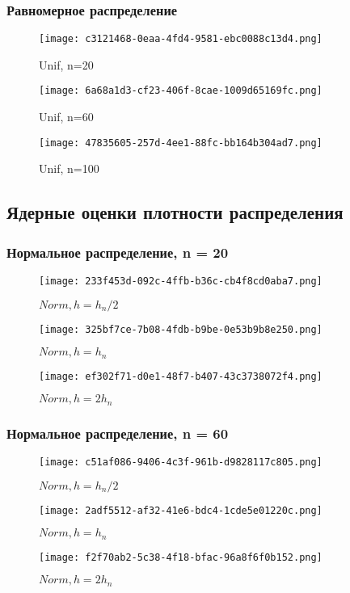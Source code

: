 \subsubsection{Равномерное распределение}
\begin{figure}[!htb]
  \texttt{[image: c3121468-0eaa-4fd4-9581-ebc0088c13d4.png]}
  \caption{Unif, n=20}
\endminipage\hfill
{}
  \texttt{[image: 6a68a1d3-cf23-406f-8cae-1009d65169fc.png]}
  \caption{Unif, n=60}
\endminipage\hfill
{}
  \texttt{[image: 47835605-257d-4ee1-88fc-bb164b304ad7.png]}
  \caption{Unif, n=100}
\endminipage
 \label{fig:unif}
\end{figure}
\newpage
\subsection{Ядерные оценки плотности распределения}%
\subsubsection{Нормальное распределение, n = 20}
\begin{figure}[!htb]
  \texttt{[image: 233f453d-092c-4ffb-b36c-cb4f8cd0aba7.png]}
  \caption{\(Norm, h=h_n/2\)}
\endminipage\hfill
{}
  \texttt{[image: 325bf7ce-7b08-4fdb-b9be-0e53b9b8e250.png]}
  \caption{\(Norm, h=h_n\)}
\endminipage\hfill
{}
  \texttt{[image: ef302f71-d0e1-48f7-b407-43c3738072f4.png]}
  \caption{\(Norm, h=2h_n\)}
\endminipage
\label{fig:norm20}
\end{figure}
\subsubsection{Нормальное распределение, n = 60}
\begin{figure}[!htb]
  \texttt{[image: c51af086-9406-4c3f-961b-d9828117c805.png]}
  \caption{\(Norm, h=h_n/2\)}
\endminipage\hfill
{}
  \texttt{[image: 2adf5512-af32-41e6-bdc4-1cde5e01220c.png]}
  \caption{\(Norm, h=h_n\)}
\endminipage\hfill
{}
  \texttt{[image: f2f70ab2-5c38-4f18-bfac-96a8f6f0b152.png]}
  \caption{\(Norm, h=2h_n\)}
\endminipage
 \label{fig:norm60}
\end{figure}
